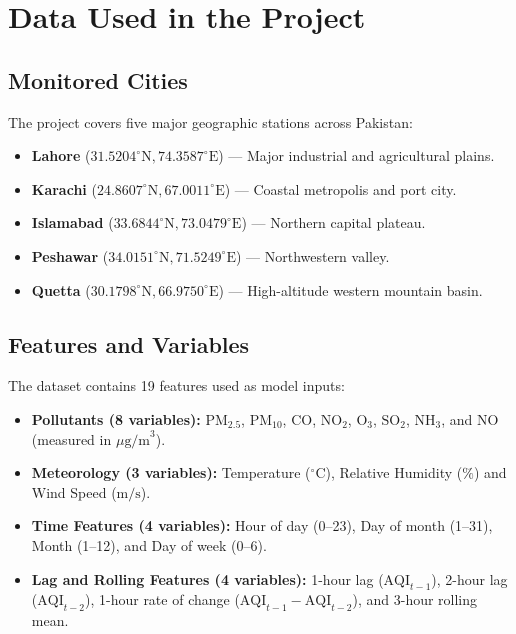 \documentclass[12pt,a4paper]{article}
\begin{document}
\section{Data Used in the Project}

\subsection{Monitored Cities}
The project covers five major geographic stations across Pakistan:
\begin{itemize}
    \item \textbf{Lahore} ($31.5204^\circ\text{N}, 74.3587^\circ\text{E}$) --- Major industrial and agricultural plains.
    \item \textbf{Karachi} ($24.8607^\circ\text{N}, 67.0011^\circ\text{E}$) --- Coastal metropolis and port city.
    \item \textbf{Islamabad} ($33.6844^\circ\text{N}, 73.0479^\circ\text{E}$) --- Northern capital plateau.
    \item \textbf{Peshawar} ($34.0151^\circ\text{N}, 71.5249^\circ\text{E}$) --- Northwestern valley.
    \item \textbf{Quetta} ($30.1798^\circ\text{N}, 66.9750^\circ\text{E}$) --- High-altitude western mountain basin.
\end{itemize}

\subsection{Features and Variables}
The dataset contains 19 features used as model inputs:
\begin{itemize}
    \item \textbf{Pollutants (8 variables):} $\text{PM}_{2.5}$, $\text{PM}_{10}$, $\text{CO}$, $\text{NO}_2$, $\text{O}_3$, $\text{SO}_2$, $\text{NH}_3$, and $\text{NO}$ (measured in $\mu\text{g/m}^3$).
    \item \textbf{Meteorology (3 variables):} Temperature ($^\circ\text{C}$), Relative Humidity ($\%$) and Wind Speed ($\text{m/s}$).
    \item \textbf{Time Features (4 variables):} Hour of day (0--23), Day of month (1--31), Month (1--12), and Day of week (0--6).
    \item \textbf{Lag and Rolling Features (4 variables):} 1-hour lag ($\text{AQI}_{t-1}$), 2-hour lag ($\text{AQI}_{t-2}$), 1-hour rate of change ($\text{AQI}_{t-1} - \text{AQI}_{t-2}$), and 3-hour rolling mean.
\end{itemize}
\end{document}
